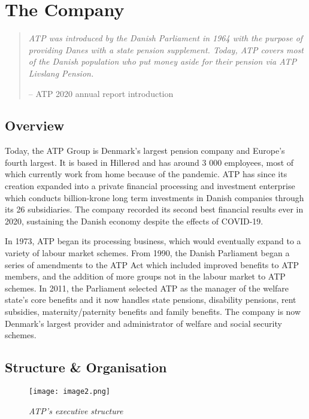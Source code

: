 \section{The Company}

\begin{quote}
    \color{dgreen} \textit{ATP was introduced by the Danish Parliament in 1964 with the purpose of providing Danes with a state pension supplement. Today, ATP covers most of the Danish population who put money aside for their pension via ATP Livslang Pension.}
    
    \color{black}-- ATP 2020 annual report introduction
\end{quote}

\subsection{Overview}

Today, the ATP Group is Denmark’s largest pension company and Europe’s fourth largest.\cite{top_pension} It is based in Hillerød and has around 3 000 employees, most of which currently work from home because of the pandemic. ATP has since its creation expanded into a private financial processing and investment enterprise which conducts billion-krone long term investments in Danish companies through its 26 subsidiaries. The company recorded its second best financial results ever in 2020, sustaining the Danish economy despite the effects of COVID-19.\cite{about_atp}

In 1973, ATP began its processing business, which would eventually expand to a variety of labour market schemes. From 1990, the Danish Parliament began a series of amendments to the ATP Act which included improved benefits to ATP members, and the addition of more groups not in the labour market to ATP schemes. In 2011, the Parliament selected ATP as the manager of the welfare state’s core benefits and it now handles state pensions, disability pensions, rent subsidies, maternity/paternity benefits and family benefits. The company is now Denmark’s largest provider and administrator of welfare and social security schemes.\cite{atp_history}

\subsection{Structure \& Organisation}

\begin{figure}[H]
    \centering
        \texttt{[image: image2.png]}
        \caption*{\textit{ATP's executive structure\cite{about_atp}}}
\end{figure}

